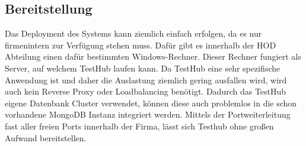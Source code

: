 \newpage

\subsection{Bereitstellung}
Das Deployment des Systems kann ziemlich einfach erfolgen, da es nur firmenintern
zur Verfügung stehen muss. Dafür gibt es innerhalb der \gls{HOD} Abteilung einen
dafür bestimmten Windows-Rechner. Dieser Rechner fungiert als Server, auf welchem TestHub
laufen kann. Da TestHub eine sehr spezifische Anwendung ist und daher die 
Auslastung ziemlich gering ausfallen wird, wird auch kein Reverse 
Proxy oder Loadbalancing benötigt.
Dadurch das TestHub eigene Datenbank Cluster verwendet, können diese auch problemlos in 
die schon vorhandene MongoDB Instanz integriert werden. Mittels der Portweiterleitung
fast aller freien Ports innerhalb der Firma, lässt sich Testhub
ohne großen Aufwand bereitstellen.

